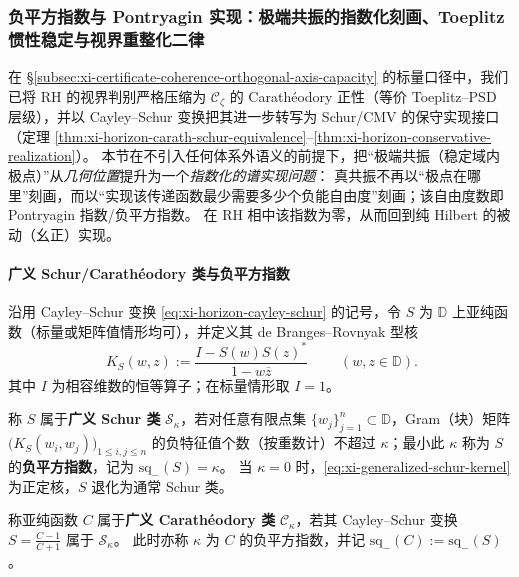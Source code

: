 \subsubsection{负平方指数与 Pontryagin 实现：极端共振的指数化刻画、Toeplitz 惯性稳定与视界重整化二律}\label{subsubsec:xi-negative-square-index-pontryagin-realization}
在 \S\ref{subsec:xi-certificate-coherence-orthogonal-axis-capacity} 的标量口径中，我们已将 RH 的视界判别严格压缩为
\(\mathscr{C}_{\zeta}\) 的 Carath\'eodory 正性（等价 Toeplitz--PSD 层级），并以 Cayley--Schur 变换把其进一步转写为 Schur/CMV 的保守实现接口（定理 \ref{thm:xi-horizon-carath-schur-equivalence}--\ref{thm:xi-horizon-conservative-realization}）。
本节在不引入任何体系外语义的前提下，把“极端共振（稳定域内极点）”从\emph{几何位置}提升为一个\emph{指数化的谱实现问题}：
真共振不再以“极点在哪里”刻画，而以“实现该传递函数最少需要多少个负能自由度”刻画；该自由度数即 Pontryagin 指数/负平方指数。
在 RH 相中该指数为零，从而回到纯 Hilbert 的被动（幺正）实现。

\paragraph{广义 Schur/Carath\'eodory 类与负平方指数}
沿用 Cayley--Schur 变换 \eqref{eq:xi-horizon-cayley-schur} 的记号，令 \(S\) 为 \(\mathbb{D}\) 上亚纯函数（标量或矩阵值情形均可），并定义其 de Branges--Rovnyak 型核
\begin{equation}\label{eq:xi-generalized-schur-kernel}
\boxed{\;
K_{S}(w,z):=\frac{I-S(w)S(z)^\ast}{1-w\overline{z}}\;}
\qquad(w,z\in\mathbb{D}).
\end{equation}
其中 \(I\) 为相容维数的恒等算子；在标量情形取 \(I=1\)。

\begin{definition}\label{def:xi-generalized-schur-negative-squares}
称 \(S\) 属于\textbf{广义 Schur 类} \(\mathcal{S}_{\kappa}\)，若对任意有限点集 \(\{w_j\}_{j=1}^{n}\subset\mathbb{D}\)，Gram（块）矩阵
\(
\bigl(K_S(w_i,w_j)\bigr)_{1\le i,j\le n}
\)
的负特征值个数（按重数计）不超过 \(\kappa\)；最小此 \(\kappa\) 称为 \(S\) 的\textbf{负平方指数}，记为
\(\mathrm{sq}_-(S)=\kappa\)。
当 \(\kappa=0\) 时，\eqref{eq:xi-generalized-schur-kernel} 为正定核，\(S\) 退化为通常 Schur 类。
\end{definition}

\begin{definition}\label{def:xi-generalized-carath-class}
称亚纯函数 \(C\) 属于\textbf{广义 Carath\'eodory 类} \(\mathcal{C}_{\kappa}\)，若其 Cayley--Schur 变换
\(
S=\frac{C-1}{C+1}
\)
属于 \(\mathcal{S}_{\kappa}\)。
此时亦称 \(\kappa\) 为 \(C\) 的负平方指数，并记 \(\mathrm{sq}_-(C):=\mathrm{sq}_-(S)\)。
\end{definition}

